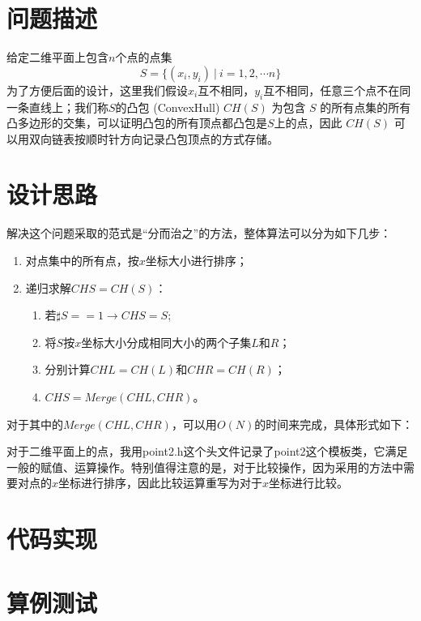
\section{问题描述}
给定二维平面上包含$n$个点的点集
\[S = \{(x_i, y_i)\ |\ i = 1,2,\cdots n\}\]
为了方便后面的设计，这里我们假设$x_i$互不相同，$y_i$互不相同，任意三个点不在同一条直线上；我们称$S$的凸包 (ConvexHull) $CH(S)$ 为包含 $S$ 的所有点集的所有凸多边形的交集，可以证明凸包的所有顶点都凸包是$S$上的点，因此 $CH(S)$ 可以用双向链表按顺时针方向记录凸包顶点的方式存储。

\section{设计思路}

解决这个问题采取的范式是“分而治之”的方法，整体算法可以分为如下几步：
\begin{enumerate}
\item 对点集中的所有点，按$x$坐标大小进行排序；
\item 递归求解$CHS = CH(S)$：
  \begin{enumerate}
  \item 若$\sharp S == 1 \rightarrow CHS = S$;
  \item 将$S$按$x$坐标大小分成相同大小的两个子集$L$和$R$；
  \item 分别计算$CHL = CH(L)$和$CHR = CH(R)$；
  \item $CHS = Merge(CHL, CHR)$。
  \end{enumerate}
\end{enumerate}


对于其中的$Merge(CHL, CHR)$，可以用$O(N)$的时间来完成，具体形式如下：


对于二维平面上的点，我用point2.h这个头文件记录了point2这个模板类，它满足一般的赋值、运算操作。特别值得注意的是，对于比较操作，因为采用的方法中需要对点的$x$坐标进行排序，因此比较运算重写为对于$x$坐标进行比较。

\section{代码实现}

\section{算例测试}

